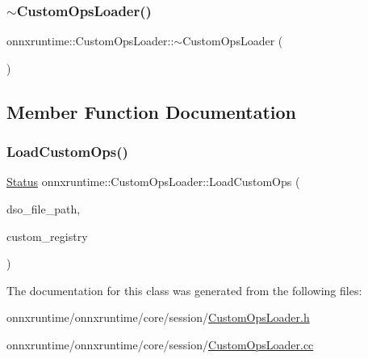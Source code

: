 \mbox{\label{classonnxruntime_1_1CustomOpsLoader_a83f3547783e89680f22aacd1deb838f3}} 
\subsubsection{\texorpdfstring{$\sim$\+Custom\+Ops\+Loader()}{~CustomOpsLoader()}}
{\footnotesize\ttfamily onnxruntime\+::\+Custom\+Ops\+Loader\+::$\sim$\+Custom\+Ops\+Loader (\begin{DoxyParamCaption}{ }\end{DoxyParamCaption})}



\subsection{Member Function Documentation}
\mbox{\label{classonnxruntime_1_1CustomOpsLoader_a07100e9ec2cf644807254969c7d09d24}} 
\subsubsection{\texorpdfstring{Load\+Custom\+Ops()}{LoadCustomOps()}}
{\footnotesize\ttfamily \mbox{\hyperlink{classonnxruntime_1_1common_1_1Status}{Status}} onnxruntime\+::\+Custom\+Ops\+Loader\+::\+Load\+Custom\+Ops (\begin{DoxyParamCaption}\item[{const std\+::string \&}]{dso\+\_\+file\+\_\+path,  }\item[{std\+::shared\+\_\+ptr$<$ \mbox{\hyperlink{classonnxruntime_1_1CustomRegistry}{Custom\+Registry}} $>$ \&}]{custom\+\_\+registry }\end{DoxyParamCaption})}



The documentation for this class was generated from the following files\+:\begin{DoxyCompactItemize}
\item 
onnxruntime/onnxruntime/core/session/\mbox{\hyperlink{CustomOpsLoader_8h}{Custom\+Ops\+Loader.\+h}}\item 
onnxruntime/onnxruntime/core/session/\mbox{\hyperlink{CustomOpsLoader_8cc}{Custom\+Ops\+Loader.\+cc}}\end{DoxyCompactItemize}
